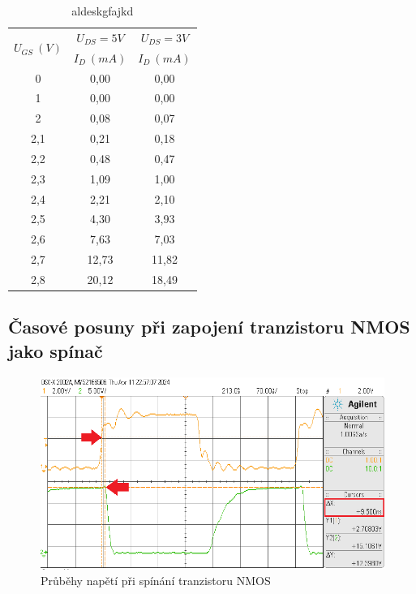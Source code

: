 \documentclass[a4paper, czech]{article}
\begin{document}
\begin{table}[H]
    \centering
    \begin{tabular}{ccc}
        \toprule
        \multirow{2}{*}{$U_{GS}\ (V)$}& $U_{DS}=5V$ & $U_{DS}=3V$ \\
         & $I_D\ (mA)$ & $I_D\ (mA)$ \\
        \midrule
        0   & 0,00  & 0,00  \\
        1   & 0,00  & 0,00  \\
        2   & 0,08  & 0,07  \\
        2,1 & 0,21  & 0,18  \\
        2,2 & 0,48  & 0,47  \\
        2,3 & 1,09  & 1,00  \\
        2,4 & 2,21  & 2,10  \\
        2,5 & 4,30  & 3,93  \\
        2,6 & 7,63  & 7,03  \\
        2,7 & 12,73 & 11,82 \\
        2,8 & 20,12 & 18,49 \\
        \bottomrule
    \end{tabular}
    \caption{aldeskgfajkd}
\end{table}

\subsection{Časové posuny při zapojení tranzistoru NMOS jako spínač}

\begin{figure}[H]
    \centering
    \includegraphics[width=\textwidth]{t_df.png}
    \caption{Průběhy napětí při spínání tranzistoru NMOS}
\end{figure}
\end{document}
